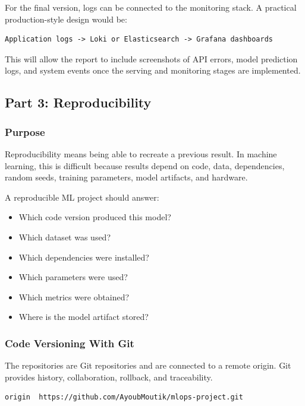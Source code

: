\documentclass[11pt,a4paper]{article}
\begin{document}
For the final version, logs can be connected to the monitoring stack. A practical production-style design would be:

\begin{lstlisting}[style=projectcode]
Application logs -> Loki or Elasticsearch -> Grafana dashboards
\end{lstlisting}

This will allow the report to include screenshots of API errors, model prediction logs, and system events once the serving and monitoring stages are implemented.

\subsection{Part 3: Reproducibility}

\subsubsection{Purpose}

Reproducibility means being able to recreate a previous result. In machine learning, this is difficult because results depend on code, data, dependencies, random seeds, training parameters, model artifacts, and hardware.

A reproducible ML project should answer:

\begin{itemize}
    \item Which code version produced this model?
    \item Which dataset was used?
    \item Which dependencies were installed?
    \item Which parameters were used?
    \item Which metrics were obtained?
    \item Where is the model artifact stored?
\end{itemize}

\subsubsection{Code Versioning With Git}

The repositories are Git repositories and are connected to a remote origin. Git provides history, collaboration, rollback, and traceability.

\begin{lstlisting}[style=projectcode]
origin  https://github.com/AyoubMoutik/mlops-project.git
\end{lstlisting}
\end{document}
